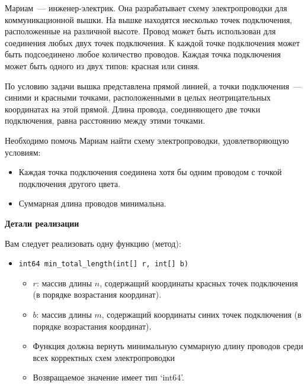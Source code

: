 Мариам~--- инженер-электрик. Она разрабатывает схему электропроводки для коммуникационной вышки. На вышке находятся несколько точек подключения, расположенные на различной высоте. Провод может быть использован для соединения любых двух точек подключения. К каждой точке подключения может быть подсоединено любое количество проводов. Каждая точка подключения может быть одного из двух типов: красная или синяя.

По условию задачи вышка представлена прямой линией, а точки подключения~--- синими и красными точками, расположенными в целых неотрицательных координатах на этой прямой. Длина провода, соединяющего две точки подключения, равна расстоянию между этими точками.

Необходимо помочь Мариам найти схему электропроводки, удовлетворяющую условиям:

\begin{itemize}
\item Каждая точка подключения соединена хотя бы одним проводом с точкой подключения
другого цвета.
\item Суммарная длина проводов минимальна.
\end{itemize}

\textbf{Детали реализации}

Вам следует реализовать одну функцию (метод):

\begin{itemize}
\item \texttt{int64 min\_total\_length(int[] r, int[] b)}
\begin{itemize}
\item $r$: массив длины $n$, содержащий координаты красных точек подключения (в порядке
возрастания координат).
\item $b$: массив длины $m$, содержащий координаты синих точек подключения (в порядке
возрастания координат).
\item Функция должна вернуть минимальную суммарную длину проводов среди всех
корректных схем электропроводки
\item Возвращаемое значение имеет тип `int64'.
\end{itemize}
\end{itemize}


